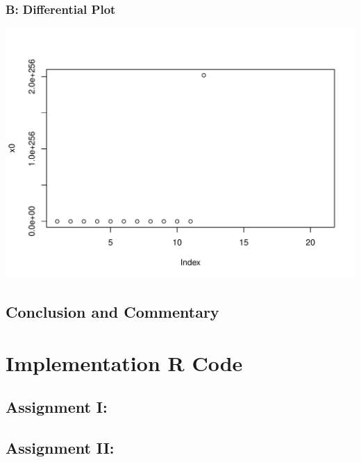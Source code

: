 \documentclass[12pt]{article}
\begin{document}
\subsubsection{B: Differential Plot}
\includegraphics[scale=1.0]{N.pdf}

\subsection{Conclusion and Commentary}

\appendix
\section{Implementation R Code}
\subsection{Assignment I:}

\subsection{Assignment II: }

\end{document}

